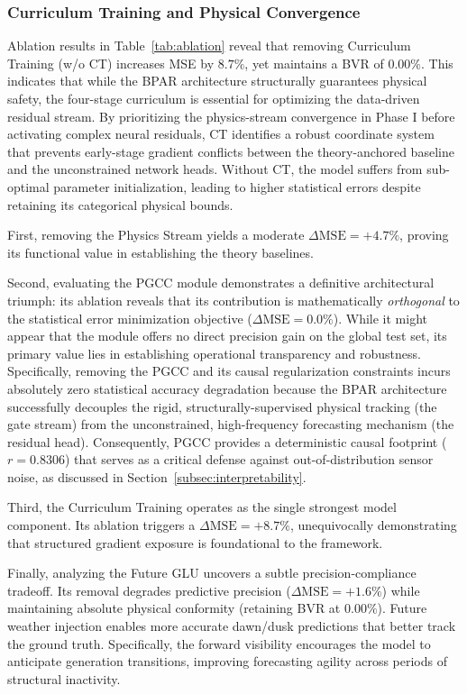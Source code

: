 \subsubsection{Curriculum Training and Physical Convergence}
Ablation results in Table~\ref{tab:ablation} reveal that removing Curriculum Training (w/o CT) increases MSE by $8.7\%$, yet maintains a BVR of $0.00\%$. This indicates that while the BPAR architecture structurally guarantees physical safety, the four-stage curriculum is essential for optimizing the data-driven residual stream. By prioritizing the physics-stream convergence in Phase I before activating complex neural residuals, CT identifies a robust coordinate system that prevents early-stage gradient conflicts between the theory-anchored baseline and the unconstrained network heads. Without CT, the model suffers from sub-optimal parameter initialization, leading to higher statistical errors despite retaining its categorical physical bounds.

First, removing the Physics Stream yields a moderate $\Delta \text{MSE} = +4.7\%$, proving its functional value in establishing the theory baselines.

Second, evaluating the PGCC module demonstrates a definitive architectural triumph: its ablation reveals that its contribution is mathematically \textit{orthogonal} to the statistical error minimization objective ($\Delta\text{MSE}=0.0\%$). While it might appear that the module offers no direct precision gain on the global test set, its primary value lies in establishing operational transparency and robustness. Specifically, removing the PGCC and its causal regularization constraints incurs absolutely zero statistical accuracy degradation because the BPAR architecture successfully decouples the rigid, structurally-supervised physical tracking (the gate stream) from the unconstrained, high-frequency forecasting mechanism (the residual head). Consequently, PGCC provides a deterministic causal footprint ($r=0.8306$) that serves as a critical defense against out-of-distribution sensor noise, as discussed in Section~\ref{subsec:interpretability}.

Third, the Curriculum Training operates as the single strongest model component. Its ablation triggers a $\Delta \text{MSE} = +8.7\%$, unequivocally demonstrating that structured gradient exposure is foundational to the framework.

Finally, analyzing the Future GLU uncovers a subtle precision-compliance tradeoff. Its removal degrades predictive precision ($\Delta \text{MSE} = +1.6\%$) while maintaining absolute physical conformity (retaining BVR at $0.00\%$). Future weather injection enables more accurate dawn/dusk predictions that better track the ground truth. Specifically, the forward visibility encourages the model to anticipate generation transitions, improving forecasting agility across periods of structural inactivity.


